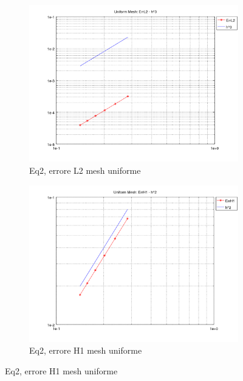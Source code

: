 \documentclass[12pt,a4paper]{report}
\theoremstyle{theorem}
\theoremstyle{theorem}
\theoremstyle{definition}
\begin{document}
\begin{figure}[!h]
	\centering
	\begin{subfigure}[b]{0.49\textwidth}
    		\includegraphics[width=\textwidth]{Eq2-L2U.png}
    		\caption{Eq2, errore L2 mesh uniforme}
    	\end{subfigure}
    	\begin{subfigure}[b]{0.49\textwidth}
    		\includegraphics[width=\textwidth]{Eq2-H1U.png}
    		\caption{Eq2, errore H1 mesh uniforme}
    	\end{subfigure}
\end{figure}
\end{document}
